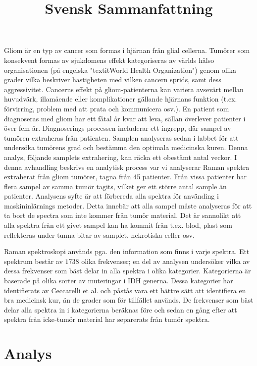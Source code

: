 \title{Svensk Sammanfattning}

Gliom är en typ av cancer som formas i hjärnan från glial cellerna. Tumörer som konsekvent formas av sjukdomens effekt kategoriseras av världs hälso organisationen (på engelska "textit{World Health Organization}") genom olika grader vilka beskriver hastigheten med vilken cancern sprids, samt dess aggressivitet. Cancerns effekt på gliom-patienterna kan variera avsevärt mellan huvudvärk, illamående eller komplikationer gällande hjärnans funktion (t.ex. förvirring, problem med att prata och kommunicera osv.). En patient som diagnoseras med gliom har ett fåtal år kvar att leva, sällan överlever patienter i över fem år. Diagnoserings processen includerar ett ingrepp, där sampel av tumören extraheras från patienten. Samplen analyseras sedan i labbet för att undersöka tumörens grad och bestämma den optimala medicinska kuren. Denna analys, följande samplets extrahering, kan räcka ett obestämt antal veckor. I denna avhandling beskrivs en analytisk process var vi analyserar Raman spektra extraherat från gliom tumörer, tagna från 45 patienter. Från vissa patienter har flera sampel av samma tumör tagits, vilket ger ett större antal sample än patienter. Analysens syfte är att förbereda alla spektra för använding i maskininlärnings metoder. Detta innebär att alla sampel måste analyseras för att ta bort de spectra som inte kommer från tumör material. Det är sannolikt att alla spektra från ett givet sampel kan ha kommit från t.ex. blod, plast som reflekteras under tunna bitar av samplet, nekrotiska celler osv.

Raman spektroskopi används pga. den information som finns i varje spektra. Ett spektrum består av $1738$ olika frekvenser; en del av analysen undersöker vilka av dessa frekvenser som bäst delar in alla spektra i olika kategorier. Kategorierna är baserade på olika sorter av muteringar i IDH generna. Dessa kategorier har identifierats av Ceccarelli et al. \cite{ceccarelli} och påstås vara ett bättre sätt att identifiera en bra medicinsk kur, än de grader som för tillfället används. De frekvenser som bäst delar alla spektra in i kategorierna beräknas före och sedan en gång efter att spektra från icke-tumör material har separerats från tumör spektra.

\section*{Analys}

